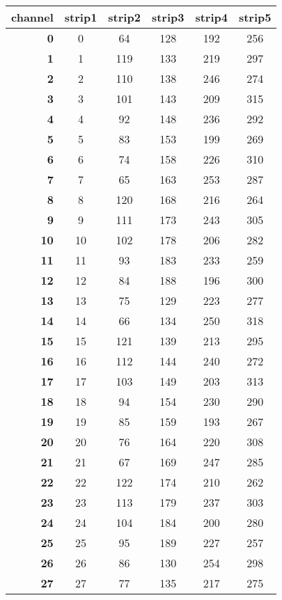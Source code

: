   \begin{longtable}{|r|c|c|c|c|c|}    
    \hline
    \textbf{channel} & strip1 & strip2 & strip3 & strip4& strip5 \\
    \hline
    \textbf{0} & 0 &64 & 128 & 192 & 256 \\
    \textbf{1} & 1 &119 & 133 & 219 & 297 \\
    \textbf{2} & 2 &110 & 138 & 246 & 274 \\
    \textbf{3} & 3 &101 & 143 & 209 & 315 \\
    \textbf{4} & 4 &92 & 148 & 236 & 292 \\
    \textbf{5} & 5 &83 & 153 & 199 & 269 \\
    \textbf{6} & 6 &74 & 158 & 226 & 310 \\
    \textbf{7} & 7 &65 & 163 & 253 & 287 \\
    \textbf{8} & 8 &120 & 168 & 216 & 264 \\
    \textbf{9} & 9 &111 & 173 & 243 & 305 \\
    \textbf{10} & 10 &102 & 178 & 206 & 282 \\
    \textbf{11} & 11 &93 & 183 & 233 & 259 \\
    \textbf{12} & 12 &84 & 188 & 196 & 300 \\
    \textbf{13} & 13 &75 & 129 & 223 & 277 \\
    \textbf{14} & 14 &66 & 134 & 250 & 318 \\
    \textbf{15} & 15 &121 & 139 & 213 & 295 \\
    \textbf{16} & 16 &112 & 144 & 240 & 272 \\
    \textbf{17} & 17 &103 & 149 & 203 & 313 \\
    \textbf{18} & 18 &94 & 154 & 230 & 290 \\
    \textbf{19} & 19 &85 & 159 & 193 & 267 \\
    \textbf{20} & 20 &76 & 164 & 220 & 308 \\
    \textbf{21} & 21 &67 & 169 & 247 & 285 \\
    \textbf{22} & 22 &122 & 174 & 210 & 262 \\
    \textbf{23} & 23 &113 & 179 & 237 & 303 \\
    \textbf{24} & 24 &104 & 184 & 200 & 280 \\
    \textbf{25} & 25 &95 & 189 & 227 & 257 \\
    \textbf{26} & 26 &86 & 130 & 254 & 298 \\
    \textbf{27} & 27 &77 & 135 & 217 & 275 \\

\end{longtable}
